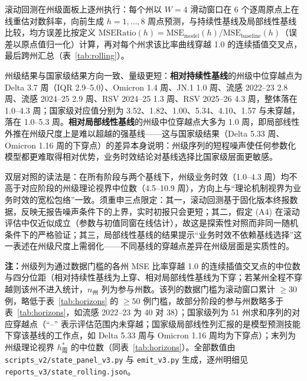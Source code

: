 \documentclass[11pt,a4paper]{article}
\theoremstyle{plain}
\theoremstyle{definition}
\begin{document}
滚动回测在州级面板上逐州执行：每个州以 $W=4$ 滑动窗口在 6 个逐周原点上在线重估对数斜率，向前生成 $h=1,\dots,8$ 周点预测，与持续性基线及局部线性基线比较，均方误差比按定义 $\text{MSERatio}(h) = \text{MSE}_{\text{model}}(h)/\text{MSE}_{\text{baseline}}(h)$（误差以原点值归一化）计算，再对每个州求该比率曲线穿越 1.0 的连续插值交叉点，最后跨州汇总（表~\ref{tab:rolling}）。

州级结果与国家级结果方向一致、量级更短：\textbf{相对持续性基线}的州级中位穿越点为 Delta 3.7 周（IQR 2.9--5.0）、Omicron 1.4 周、JN.1 1.0 周、流感 2022--23 2.8 周、流感 2024--25 2.9 周、RSV 2024--25 1.3 周、RSV 2025--26 4.3 周，整体落在 1.0--4.3 周；国家级对应值分别为 3.52、1.82、1.00、5.34、4.10、1.57 与未穿越，落在 1.0--5.3 周。\textbf{相对局部线性基线}的州级中位穿越点大多为 1.0 周，即局部线性外推在州级尺度上是难以超越的强基线——这与国家级结果（Delta 5.33 周、Omicron 1.16 周的下穿点）的差异本身说明：州级序列的短程噪声使任何参数化模型都更难取得相对优势，业务时效结论对基线选择比国家级层面更敏感。

双层对照的读法是：在所有阶段与两个基线下，州级业务时效（1.0--4.3 周）均不高于对应阶段的州级理论视界中位数（4.5--10.9 周），方向上与“理论机制视界为业务时效的宽松包络”一致。须重申三点限定：其一，滚动回测基于固化版本终报数据，反映无报告噪声条件下的上界，实时初报只会更短；其二，假定 (A4) 在滚动评估中仅近似成立（参数与初值同窗在线估计），故这是探索性对照而非同一随机条件下的严格验证；其三，局部线性基线的结果提示“业务时效不依赖基线选择”这一表述在州级尺度上需弱化——不同基线的穿越点差异在州级层面是实质性的。

\begin{table}[htbp]
\centering
\footnotesize
\caption{理论机制视界与伪实时滚动业务时效的州级双层对照}
\label{tab:rolling}
\resizebox{\textwidth}{!}{%
%
}
\vspace{2pt}
\begin{flushleft}
\scriptsize \textbf{注：}州级列为通过数据门槛的各州 MSE 比率穿越 1.0 的连续插值交叉点的中位数与四分位距（相对持续性基线为上穿、相对局部线性基线为下穿；若某州全程不穿越则该州不进入统计，$n_{\text{州}}$ 列为参与州数。该列的数据门槛为滚动窗口累计 $\ge 30$ 例，略低于表~\ref{tab:horizons} 的 $\ge 50$ 例门槛，故部分阶段的参与州数略多于表~\ref{tab:horizons}，如流感 2022--23 为 40 对 38）；国家级列为 51 州求和序列的对应穿越点（``--'' 表示评估范围内未穿越；国家级局部线性列汇报的是模型预测技能下穿该基线的工作点，如 Delta 5.33 周与 Omicron 1.16 周均为下穿点）；末列为州级理论视界 $h^*_{\text{周}}$ 的中位数（同表~\ref{tab:horizons}）。全部数值由 \texttt{scripts\_v2/state\_panel\_v3.py} 与 \texttt{emit\_v3.py} 生成，逐州明细见 \texttt{reports\_v3/state\_rolling.json}。\end{flushleft}
\end{table}
\end{document}
